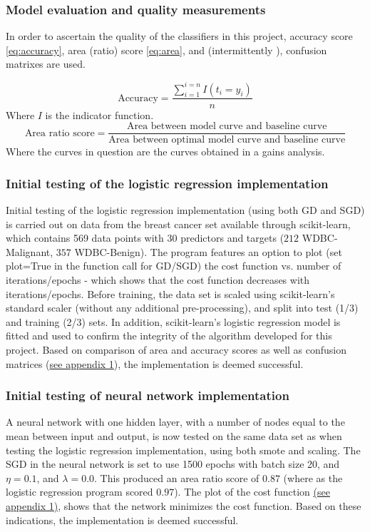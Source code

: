 \documentclass[%
oneside,                 %
final,                   %
10pt]{article}
\begin{document}
\subsubsection{Model evaluation and quality measurements}
In order to ascertain the quality of the classifiers in this project, accuracy score \eqref{eq:accuracy}, area (ratio) score \eqref{eq:area}, and (intermittently ), confusion matrixes are used. 

\begin{equation}
\text{Accuracy}=\frac{\sum_{i=1}^{i=n}I(t_i=y_i)}{n}
\label{eq:accuracy}
\end{equation}
Where $I$ is the indicator function.
\begin{equation}
\text{Area ratio score}=\frac{\text{Area between model curve and baseline curve}}{\text{Area between optimal model curve and baseline curve}}
\label{eq:area}
\end{equation}
Where the curves in question are the curves obtained in a gains analysis. 

\subsubsection{Initial testing of the logistic regression implementation}
Initial testing of the logistic regression implementation (using both GD and SGD) is carried out on data from the breast cancer set available through scikit-learn, which contains 569 data points with 30 predictors and targets ($212$ WDBC-Malignant, $ 357$ WDBC-Benign). The program features an option to plot (set plot=True in the function call for GD/SGD) the cost function vs. number of iterations/epochs - which shows that the cost function decreases with iterations/epochs. Before training, the data set is scaled using scikit-learn's standard scaler (without any additional pre-processing), and split into test (1/3) and training (2/3) sets. In addition, scikit-learn's logistic regression model is fitted and used to confirm the integrity of the algorithm developed for this project. Based on comparison of area and accuracy scores as well as confusion matrices (\hyperref[APP_1]{see appendix 1}), the implementation is deemed successful.

\subsubsection{Initial testing of neural network implementation}
A neural network with one hidden layer, with a number of nodes equal to the mean between input and output, is now tested on the same data set as when testing the logistic regression implementation, using both smote and scaling. The SGD in the neural network is set to use 1500 epochs with batch size 20, and $\eta=0.1$, and $\lambda=0.0$. This produced an area ratio score of $0.87$ (where as the logistic regression program scored $0.97$). The plot of the cost function \hyperref[APP_1]{(see appendix 1)}, shows that the network minimizes the cost function. Based on these indications, the implementation is deemed successful.
\end{document}
